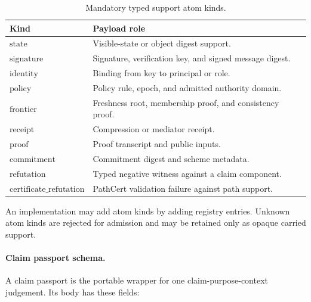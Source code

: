 \documentclass[11pt,twoside]{article}
\newcommand{\OGTableFont}{\small}
\newcommand{\OGTableHeaderRow}{\rowcolor{tableheaderbg}}
\newcommand{\TableHeaderRow}{\OGTableHeaderRow}
\newenvironment{OGTable}[2][ht]{%
  \begin{table}[#1]
  \centering
  #2
  \renewcommand{\arraystretch}{1.08}%
  \rowcolors{2}{tablerowbg}{white}%
}{%
  \rowcolors{2}{}{}%
  \end{table}%
}
\theoremstyle{definition}
\begin{document}
\begin{OGTable}{\OGTableFont}
\begin{tabularx}{\textwidth}{>{\raggedright\arraybackslash}p{}>{\raggedright\arraybackslash}X}
\toprule
\TableHeaderRow \textbf{Kind} & \textbf{Payload role} \\
\midrule
$\mathrm{state}$ & Visible-state or object digest support. \\
$\mathrm{signature}$ & Signature, verification key, and signed message digest. \\
$\mathrm{identity}$ & Binding from key to principal or role. \\
$\mathrm{policy}$ & Policy rule, epoch, and admitted authority domain. \\
$\mathrm{frontier}$ & Freshness root, membership proof, and consistency proof. \\
$\mathrm{receipt}$ & Compression or mediator receipt. \\
$\mathrm{proof}$ & Proof transcript and public inputs. \\
$\mathrm{commitment}$ & Commitment digest and scheme metadata. \\
$\mathrm{refutation}$ & Typed negative witness against a claim component. \\
$\mathrm{certificate\_refutation}$ & PathCert validation failure against path support. \\
\bottomrule
\end{tabularx}
\caption{Mandatory typed support atom kinds.}
\label{tab:typed-support-atom-kinds}
\end{OGTable}
\FloatBarrier

An implementation may add atom kinds by adding registry entries. Unknown atom
kinds are rejected for admission and may be retained only as opaque carried
support.

\paragraph{Claim passport schema.}
A claim passport is the portable wrapper for one claim-purpose-context
judgement. Its body has these fields:
\end{document}
